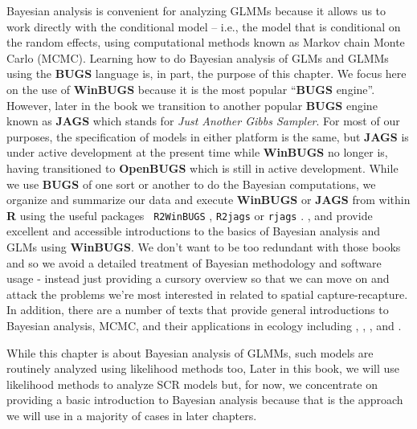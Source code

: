 Bayesian analysis is convenient for analyzing GLMMs because it allows
us to work directly with the conditional model -- i.e., the model that
is conditional on the random effects, using computational methods
known as Markov chain Monte Carlo (MCMC). Learning how to do Bayesian
analysis of GLMs and GLMMs using the {\bf BUGS} language is, in part, the purpose
of this chapter. We focus here on the use of {\bf WinBUGS} because it
is the most popular ``{\bf BUGS} engine''. However, later in the book
we transition to another popular {\bf BUGS} engine known as {\bf
  JAGS} \citep{plummer:2009} which stands for {\it Just Another Gibbs
  Sampler}. For most of our purposes, the specification of models in
either platform is the same, but {\bf JAGS} is under active
development at the present time while {\bf WinBUGS} no longer is,
having transitioned to 
{\bf OpenBUGS} \citep{lunn_etal:2009} which is still in active
development.  
 While we use {\bf BUGS} of one sort or another to do the Bayesian
computations, we organize and summarize our data and execute {\bf
  WinBUGS} or {\bf JAGS} from within {\bf R} using the useful packages 
\mbox{\tt
  R2WinBUGS} \citep{sturtz_etal:2005}, \mbox{\tt R2jags} \citep{su_yajima:2011} or \mbox{\tt rjags} \citep{plummer:2009}.  \citet{kery:2010}, and
\citet{kery_schaub:2011} provide excellent and accessible introductions to the basics
of Bayesian analysis and GLMs using {\bf WinBUGS}.
We don't want to
be too redundant with those books and so we avoid a detailed
treatment of Bayesian methodology and software usage - instead just providing a cursory
overview so that we can move on and attack the problems we're most
interested in related to spatial capture-recapture.  In addition,
there are a number of texts that provide general introductions to
Bayesian analysis, MCMC, and their applications in ecology including
\citet{mccarthy:2007}, \citet{kery:2010}, \citet{link_barker:2010}, and
\citet{king_etal:2009}.


While this chapter is about Bayesian analysis of GLMMs, such models
are routinely analyzed using likelihood methods too, 
Later in
this book, we will use likelihood methods to analyze SCR models but,
for now, we concentrate on providing a basic introduction to Bayesian
analysis because that is the approach we will use in a majority of
cases in later chapters.


